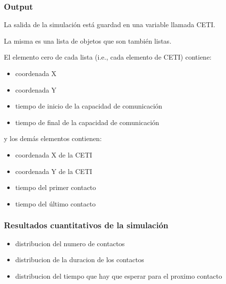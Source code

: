 \documentclass[handout]{beamer}
\theoremstyle{plain}
\theoremstyle{definition}
\theoremstyle{remark}
\begin{document}
\begin{frame}\frametitle{Output}

La salida de la simulación está guardad en una variable llamada CETI.

La misma es una lista de objetos que son también listas.

El elemento cero de cada lista (i.e., cada elemento de CETI) contiene:

\begin{itemize}
   \item coordenada X
   \item coordenada Y
   \item tiempo de inicio de la capacidad de comunicaci\'on
   \item tiempo de final de la capacidad de comunicaci\'on
\end{itemize}

y los demás elementos contienen:
 
\begin{itemize}
   \item coordenada X de la CETI
   \item coordenada Y de la CETI
   \item tiempo del primer contacto
   \item tiempo del \'ultimo contacto
\end{itemize}
 

\end{frame}%

 
\begin{frame}\frametitle{Resultados cuantitativos de la simulaci\'on}

\begin{itemize}
   \item distribucion del numero de contactos
   \item distribucion de la duracion de los contactos
   \item distribucion del tiempo que hay que esperar para el proximo contacto
\end{itemize}
 

\end{frame}%
                               
\end{document}
